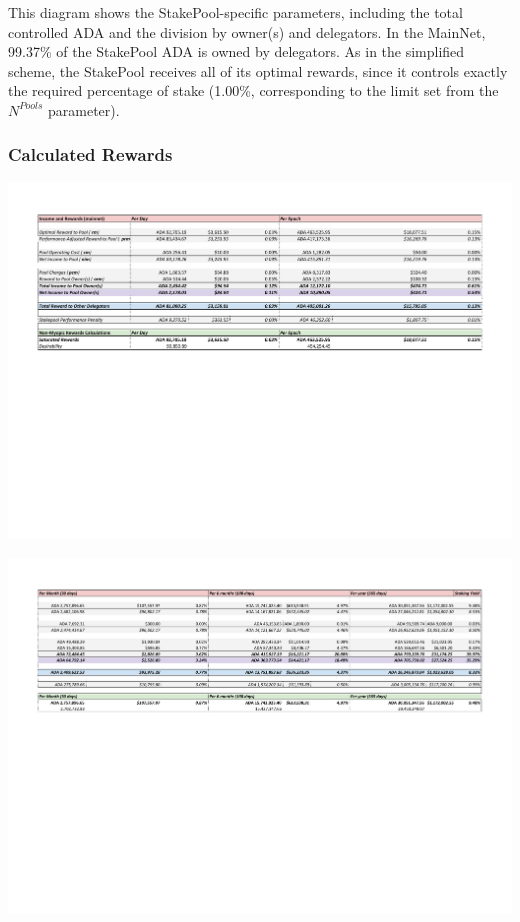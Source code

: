 \documentclass[11pt,a4paper,dvipsnames,twosided,final]{article}
\newcommand{\ada}{ADA{}}
\begin{document}
\noindent
This diagram shows the StakePool-specific parameters, including the total controlled \ada{} and the
division by owner(s) and delegators.  In the MainNet, 99.37\% of the StakePool \ada{} is owned
by delegators.  As in the simplified scheme, the StakePool receives all of its optimal rewards, since it controls
exactly the required percentage of stake (1.00\%, corresponding to the limit set from
the $N^{\textit{Pools}}$ parameter).

\subsubsection*{Calculated Rewards}

\hspace{-0.65in}\begin{minipage}{\textwidth}
  \noindent  \includegraphics[width=1.2\textwidth]{RCM4.pdf}

  \vspace{-3in}
  \noindent  \includegraphics[width=1.2\textwidth]{RCM5.pdf}

  \vspace{-2.8in}
\end{minipage}
\end{document}
